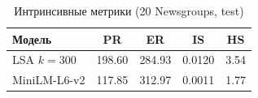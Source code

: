 \renewcommand{\arraystretch}{1.4}
\begin{table}[H]
  \centering
  \begin{tabular}{|l|c|c|c|c|}
    \hline
    Модель & PR & ER & IS & HS \\
    \hline
    LSA $k=300$ & 198.60 & 284.93 & 0.0120 & 3.54 \\
    MiniLM-L6-v2 & 117.85 & 312.97 & 0.0011 & 1.77 \\
    \hline
  \end{tabular}
  \caption{Интринсивные метрики (20 Newsgroups, test)}
  \label{tab:intrinsic}
\end{table}
